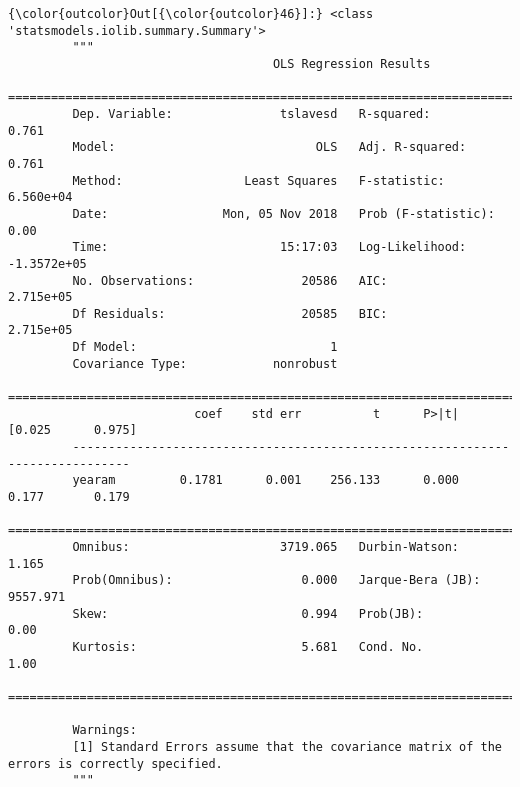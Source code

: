 \documentclass[11pt]{article}
\begin{document}
\begin{Verbatim}[commandchars=\\\{\}]
{\color{outcolor}Out[{\color{outcolor}46}]:} <class 'statsmodels.iolib.summary.Summary'>
         """
                                     OLS Regression Results                            
         ==============================================================================
         Dep. Variable:               tslavesd   R-squared:                       0.761
         Model:                            OLS   Adj. R-squared:                  0.761
         Method:                 Least Squares   F-statistic:                 6.560e+04
         Date:                Mon, 05 Nov 2018   Prob (F-statistic):               0.00
         Time:                        15:17:03   Log-Likelihood:            -1.3572e+05
         No. Observations:               20586   AIC:                         2.715e+05
         Df Residuals:                   20585   BIC:                         2.715e+05
         Df Model:                           1                                         
         Covariance Type:            nonrobust                                         
         ==============================================================================
                          coef    std err          t      P>|t|      [0.025      0.975]
         ------------------------------------------------------------------------------
         yearam         0.1781      0.001    256.133      0.000       0.177       0.179
         ==============================================================================
         Omnibus:                     3719.065   Durbin-Watson:                   1.165
         Prob(Omnibus):                  0.000   Jarque-Bera (JB):             9557.971
         Skew:                           0.994   Prob(JB):                         0.00
         Kurtosis:                       5.681   Cond. No.                         1.00
         ==============================================================================
         
         Warnings:
         [1] Standard Errors assume that the covariance matrix of the errors is correctly specified.
         """
\end{Verbatim}
            
\end{document}
